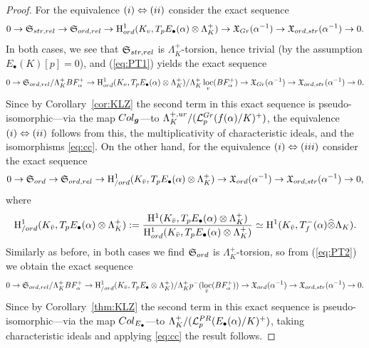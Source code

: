 \documentclass[a4paper,10pt]{amsart}
\numberwithin{equation}{section}
\numberwithin{equation}{section}
\theoremstyle{plain}
\theoremstyle{definition}
\theoremstyle{definition}
\theoremstyle{plain}
\theoremstyle{plain}
\theoremstyle{plain}
\theoremstyle{plain}
\newcommand{\X}{\mathfrak{X}}
\newcommand{\bg}{\boldsymbol{g}}
\DeclareMathOperator{\loc}{loc}
\newcommand{\Lcal}{\mathcal{L}}
\newcommand{\rH}{\mathrm{H}}
\begin{document}
\begin{proof}
For the equivalence ${\rm (i)}\Leftrightarrow{\rm (ii)}$ consider the exact sequence
\begin{equation}\label{eq:PT1}
0\rightarrow\mathfrak{S}_{\rm str,\rm rel}\rightarrow\mathfrak{S}_{\rm ord,\rm rel}\rightarrow\rH^1_{\rm ord}(K_{v},T_pE_\bullet(\alpha)\otimes\Lambda_K^+)\rightarrow\X_{\rm Gr}(\alpha^{-1})\rightarrow\X_{\rm ord,\rm str}(\alpha^{-1})\rightarrow 0.
\end{equation}
In both cases, we see that $\mathfrak{S}_{\rm str,\rm rel}$ is $\Lambda_K^+$-torsion, hence trivial (by the assumption $E_\bullet(K)[p]=0$), and (\ref{eq:PT1}) yields the exact sequence
\[
0 \to\mathfrak{S}_{\rm ord,\rm rel}/\Lambda_K^+ BF^+_{\alpha} \to\rH^1_{\rm ord}(K_{v},T_pE_\bullet(\alpha)\otimes\Lambda_K^+)/\Lambda_K^+\loc_{v}(BF_{\alpha}^+)\to\X_{\rm Gr}(\alpha^{-1})\to \X_{\rm ord,\rm str}(\alpha^{-1}) \to 0.
\]
Since by Corollary~\ref{cor:KLZ} the second term in this exact sequence is pseudo-isomorphic---via the map ${\rm Col}_{\bg}$---to $\Lambda_K^{+,\rm ur}/(\Lcal_p^{\rm Gr}(f(\alpha)/K)^+)$, the equivalence ${\rm (i)}\Leftrightarrow{\rm (ii)}$ follows from this, the multiplicativity of characteristic ideals, and the isomorphisms \eqref{eq:cc}. On the other hand, for the equivalence ${\rm (i)}\Leftrightarrow{\rm (iii)}$ consider the exact sequence
\begin{equation}\label{eq:PT2}
0\rightarrow\mathfrak{S}_{\rm ord}\rightarrow\mathfrak{S}_{\rm ord,\rm rel}\rightarrow\rH_{/\rm ord}^1(K_{\bar v},T_pE_\bullet(\alpha)\otimes\Lambda_K^+)\rightarrow\X_{\rm ord}(\alpha^{-1})\rightarrow\X_{\rm ord,\rm str}(\alpha^{-1})\rightarrow 0,
\end{equation}
where 
\[
\rH^1_{/\rm ord }(K_{\bar v},T_pE_\bullet(\alpha)\otimes\Lambda_K^+):=\frac{\rH^1(K_{\bar v},T_pE_\bullet(\alpha)\otimes\Lambda_K^+)}{\rH^1_{\rm ord }(K_{\bar v},T_pE_\bullet(\alpha)\otimes\Lambda_K^+)}\simeq\rH^1(K_{\bar v},T_f^-(\alpha)\widehat\otimes\Lambda_K).
\]
Similarly as before, in both cases we find $\mathfrak{S}_{\rm ord}$ is $\Lambda_K^+$-torsion, so from (\ref{eq:PT2}) we obtain the exact sequence
\[
0\to \mathfrak{S}_{\rm ord,\rm rel}/\Lambda_K^+ BF_{\alpha}^+ \to \rH^1_{/\rm ord}(K_{\bar{v}},T_pE_\bullet\otimes\Lambda_K^+)/\Lambda_K^+p^-(\loc_{\bar{v}}(BF_{\alpha}^+))\to \X_{\rm ord}(\alpha^{-1})\to \X_{\rm ord,\rm str}(\alpha^{-1}) \to 0.
\]
Since by Corollary~\ref{thm:KLZ} the second term in this exact sequence is pseudo-isomorphic---via the map ${\rm Col}_{E_\bullet}$---to $\Lambda_K^+/(\Lcal_p^{\rm PR}(E_\bullet(\alpha)/K)^+)$, taking characteristic ideals and applying \eqref{eq:cc} the result follows.
\end{proof}
\end{document}

